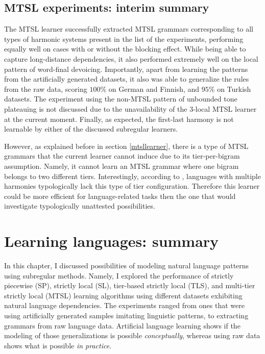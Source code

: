 \subsection{MTSL experiments: interim summary}

The MTSL learner successfully extracted MTSL grammars corresponding to all types of harmonic systems present in the list of the experiments, performing equally well on cases with or without the blocking effect.
While being able to capture long-distance dependencies, it also performed extremely well on the local pattern of word-final devoicing.
Importantly, apart from learning the patterns from the artificially generated datasets, it also was able to generalize the rules from the raw data, scoring $100$\% on German and Finnish, and $95$\% on Turkish datasets.
The experiment using the non-MTSL pattern of unbounded tone plateauing is not discussed due to the unavailability of the $3$-local MTSL learner at the current moment.
Finally, as expected, the first-last harmony is not learnable by either of the discussed subregular learners.


However, as explained before in section \ref{mtsllearner}, there is a type of MTSL grammars that the current learner cannot induce due to its tier-per-bigram assumption.
Namely, it cannot learn an MTSL grammar where one bigram belongs to two different tiers.
Interestingly, according to \cite{AksenovaDeshmukh2018}, languages with multiple harmonies typologically lack this type of tier configuration.
Therefore this learner could be more efficient for language-related tasks then the one that would investigate typologically unattested possibilities.


\section{Learning languages: summary}
\label{interimsummarylanguages}

In this chapter, I discussed possibilities of modeling natural language patterns using subregular methods.
Namely, I explored the performance of strictly piecewise (SP), strictly local (SL), tier-based strictly local (TLS), and multi-tier strictly local (MTSL) learning algorithms using different datasets exhibiting natural language dependencies.
The experiments ranged from ones that were using artificially generated samples imitating linguistic patterns, to extracting grammars from raw language data.
Artificial language learning shows if the modeling of those generalizations is possible \emph{conceptually}, whereas using raw data shows what is possible \emph{in practice}.

